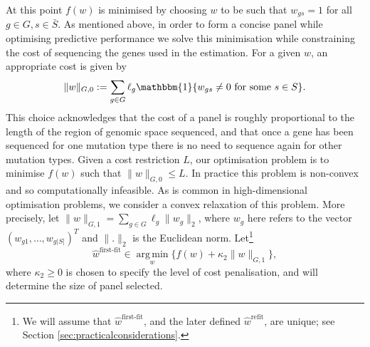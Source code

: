 \documentclass[10pt,twoside,openright]{report}
\DeclareMathOperator*{\argmin}{arg\,min}
\begin{document}
At this point $f(w)$ is minimised by choosing $w$ to be such that $w_{gs}= 1$ for all $g\in G, s\in\bar{S}$. As mentioned above, in order to form a concise panel while optimising predictive performance we solve this minimisation while constraining the cost of sequencing the genes used in the estimation. For a given $w$, an appropriate cost is given by
\[
\|w\|_{G,0} := \sum_{g \in G} \ell_g\mathbbm{1}\{w_{gs} \neq 0 \ \mathrm{for \ some \ } s \in S \} .
\]
This choice acknowledges that the cost of a panel is roughly proportional to the length of the region of genomic space sequenced, and that once a gene has been sequenced for one mutation type there is no need to sequence again for other mutation types. Given a cost restriction $L$, our optimisation problem is to minimise $f(w)$ such that $\|w\|_{G,0} \leq L$. In practice this problem is non-convex and so computationally infeasible. As is common in high-dimensional optimisation problems, we consider a convex relaxation of this problem.  More precisely, let $\|w\|_{G,1} = \sum_{g \in G} \ell_g \|w_g\|_2$, where $w_g$ here refers to the vector $(w_{g1}, \ldots, w_{g|S|})^T$ and $\|.\|_2$ is the Euclidean norm.  Let\footnote{We will assume that $\hat{w}^{\text{first-fit}}$, and the later defined $\hat{w}^{\text{refit}}$, are unique; see Section \ref{sec:practicalconsiderations}.}
\begin{equation}
    \label{eq:wfirstfit}
\hat{w}^{\text{first-fit}} \in \argmin\limits_{w} \bigl\{ f(w) +\kappa_2\|w\|_{G,1} \bigr\},
\end{equation}
where $\kappa_2 \geq 0$ is chosen to specify the level of cost penalisation, and will determine the size of panel selected.
\end{document}
